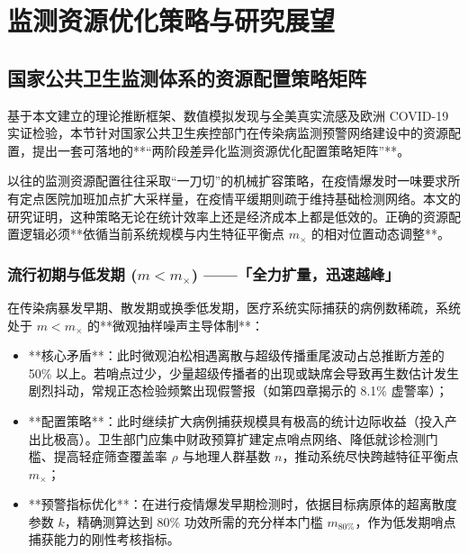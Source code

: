 \chapter{监测资源优化策略与研究展望}\label{ch:policy}

\section{国家公共卫生监测体系的资源配置策略矩阵}\label{sec:policy_matrix}

基于本文建立的理论推断框架、数值模拟发现与全美真实流感及欧洲 COVID-19 实证检验，本节针对国家公共卫生疾控部门在传染病监测预警网络建设中的资源配置，提出一套可落地的**“两阶段差异化监测资源优化配置策略矩阵”**。

以往的监测资源配置往往采取“一刀切”的机械扩容策略，在疫情爆发时一味要求所有定点医院加班加点扩大采样量，在疫情平缓期则疏于维持基础检测网络。本文的研究证明，这种策略无论在统计效率上还是经济成本上都是低效的。正确的资源配置逻辑必须**依循当前系统规模与内生特征平衡点 $m_\times$ 的相对位置动态调整**。

\subsection{流行初期与低发期 ($m < m_\times$) ——「全力扩量，迅速越峰」}
在传染病暴发早期、散发期或换季低发期，医疗系统实际捕获的病例数稀疏，系统处于 $m < m_\times$ 的**微观抽样噪声主导体制**：
\begin{itemize}
    \item **核心矛盾**：此时微观泊松相遇离散与超级传播重尾波动占总推断方差的 50\% 以上。若哨点过少，少量超级传播者的出现或缺席会导致再生数估计发生剧烈抖动，常规正态检验频繁出现假警报（如第四章揭示的 8.1\% 虚警率）；
    \item **配置策略**：此时继续扩大病例捕获规模具有极高的统计边际收益（投入产出比极高）。卫生部门应集中财政预算扩建定点哨点网络、降低就诊检测门槛、提高轻症筛查覆盖率 $\rho$ 与地理人群基数 $n$，推动系统尽快跨越特征平衡点 $m_\times$；
    \item **预警指标优化**：在进行疫情爆发早期检测时，依据目标病原体的超离散度参数 $k$，精确测算达到 80\% 功效所需的充分样本门槛 $m_{80\%}$，作为低发期哨点捕获能力的刚性考核指标。
\end{itemize}

